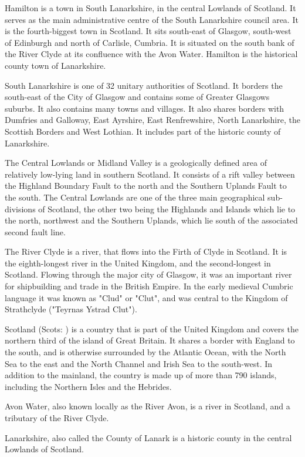 \documentclass{article} \usepackage{iclr2019_conference,times}
\begin{document}
Hamilton is a town in South Lanarkshire, in the central Lowlands of Scotland. It serves as the main administrative centre of the South Lanarkshire council area. It is the fourth-biggest town in Scotland. It sits south-east of Glasgow, south-west of Edinburgh and north of Carlisle, Cumbria. It is situated on the south bank of the River Clyde at its confluence with the Avon Water. Hamilton is the historical county town of Lanarkshire.

South Lanarkshire is one of 32 unitary authorities of Scotland. It borders the south-east of the City of Glasgow and contains some of Greater Glasgows suburbs. It also contains many towns and villages. It also shares borders with Dumfries and Galloway, East Ayrshire, East Renfrewshire, North Lanarkshire, the Scottish Borders and West Lothian. It includes part of the historic county of Lanarkshire. 

The Central Lowlands or Midland Valley is a geologically defined area of relatively low-lying land in southern Scotland. It consists of a rift valley between the Highland Boundary Fault to the north and the Southern Uplands Fault to the south. The Central Lowlands are one of the three main geographical sub-divisions of Scotland, the other two being the Highlands and Islands which lie to the north, northwest and the Southern Uplands, which lie south of the associated second fault line.

The River Clyde is a river, that flows into the Firth of Clyde in Scotland. It is the eighth-longest river in the United Kingdom, and the second-longest in Scotland. Flowing through the major city of Glasgow, it was an important river for shipbuilding and trade in the British Empire. In the early medieval Cumbric language it was known as "Clud" or "Clut", and was central to the Kingdom of Strathclyde ("Teyrnas Ystrad Clut").

Scotland (Scots: ) is a country that is part of the United Kingdom and covers the northern third of the island of Great Britain. It shares a border with England to the south, and is otherwise surrounded by the Atlantic Ocean, with the North Sea to the east and the North Channel and Irish Sea to the south-west. In addition to the mainland, the country is made up of more than 790 islands, including the Northern Isles and the Hebrides.

Avon Water, also known locally as the River Avon, is a river in Scotland, and a tributary of the River Clyde.

Lanarkshire, also called the County of Lanark is a historic county in the central Lowlands of Scotland.
\end{document}

